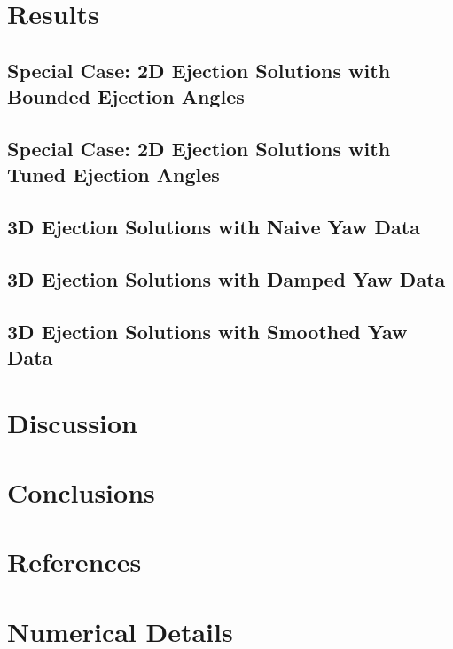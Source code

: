 \documentclass[10pt,legalpaper,twocolumn,reqno]{amsart}
\begin{document}
\section{Results}
\subsection{Special Case: 2D Ejection Solutions with Bounded Ejection Angles}

\subsection{Special Case: 2D Ejection Solutions with Tuned Ejection Angles}

\subsection{3D Ejection Solutions with Naive Yaw Data}

\subsection{3D Ejection Solutions with Damped Yaw Data}

\subsection{3D Ejection Solutions with Smoothed Yaw Data}


\section{Discussion}

\section{Conclusions}

\section{References}

\pagebreak
\appendix
\section{Numerical Details}
\end{document}
